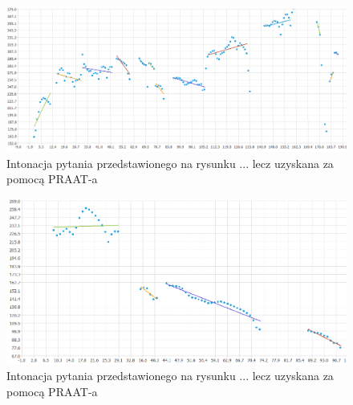 \documentclass[a4paper,12 pt]{report}
\begin{document}
\begin{figure}[h]
\centering
\includegraphics[scale=0.7]{pytanie_rozstrzygniecia_2_emocje_praat.png}
\caption{Intonacja pytania przedstawionego na rysunku ... lecz uzyskana za pomocą PRAAT-a}
\end{figure}
\FloatBarrier


\begin{figure}[h]
\centering
\includegraphics[scale=0.7]{pytanie_dopelnienia_praat_2.png}
\caption{Intonacja pytania przedstawionego na rysunku ... lecz uzyskana za pomocą PRAAT-a}
\end{figure}
\FloatBarrier

\newpage
\end{document}
